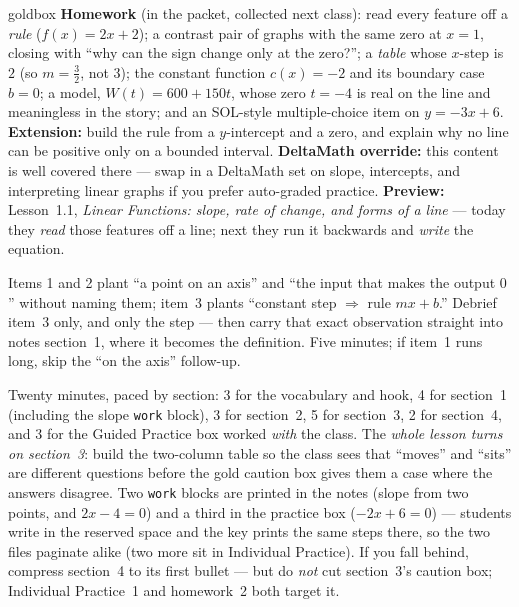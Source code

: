\documentclass[10pt]{article}
\begin{document}
\boxguard
\begin{skillbox}{goldbox}
\textbf{Homework} (in the packet, collected next class): read every feature off a \emph{rule}
($f(x)=2x+2$); a contrast pair of graphs with the same zero at $x=1$, closing with ``why can the
sign change only at the zero?''; a \emph{table} whose $x$-step is $2$ (so $m=\tfrac32$, not $3$);
the constant function $c(x)=-2$ and its boundary case $b=0$; a model, $W(t)=600+150t$, whose zero
$t=-4$ is real on the line and meaningless in the story; and an SOL-style multiple-choice item on
$y=-3x+6$. \textbf{Extension:} build the rule from a $y$-intercept and a zero, and explain why no
line can be positive only on a bounded interval. \textbf{DeltaMath override:} this content is well
covered there --- swap in a DeltaMath set on slope, intercepts, and interpreting linear graphs if you
prefer auto-graded practice. \textbf{Preview:} Lesson~1.1, \emph{Linear Functions: slope, rate of
change, and forms of a line} --- today they \emph{read} those features off a line; next they run it
backwards and \emph{write} the equation.
\end{skillbox}

\begin{teachernote}[Warm-Up]
Items 1 and 2 plant ``a point on an axis'' and ``the input that makes the output $0$'' without
naming them; item~3 plants ``constant step $\Rightarrow$ rule $mx+b$.'' Debrief item~3 only, and
only the step --- then carry that exact observation straight into notes section~1, where it becomes
the definition. Five minutes; if item~1 runs long, skip the ``on the axis'' follow-up.
\end{teachernote}

\begin{teachernote}
Twenty minutes, paced by section: 3 for the vocabulary and hook, 4 for section~1 (including the
slope \texttt{work} block), 3 for section~2, 5 for section~3, 2 for section~4, and 3 for the
Guided Practice box worked \emph{with} the class. The
\emph{whole lesson turns on section~3}: build the two-column table so the class sees that
``moves'' and ``sits'' are different questions before the gold caution box gives them a case where
the answers disagree. Two \texttt{work} blocks are printed in the notes (slope from two points, and
$2x-4=0$) and a third in the practice box ($-2x+6=0$) --- students write in the reserved space and
the key prints the same steps there, so the two files paginate alike (two more sit in Individual
Practice). If you fall behind, compress section~4 to its first bullet --- but do \emph{not} cut
section~3's caution box; Individual Practice~1 and homework~2 both target it.
\end{teachernote}
\end{document}

